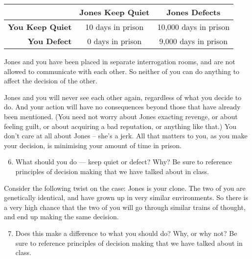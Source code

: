 \documentclass[12pt,a4paper]{article}
\begin{document}
\begin{center}
\begin{tabular}{r ||c| c}
& \textbf{Jones Keep Quiet} & \textbf{Jones Defects}\\ \hline \hline
\textbf{You Keep Quiet} & 10 days in prison & 10,000 days in prison\\ \hline
\textbf{You Defect} & 0 days in prison & 9,000 days in prison\\
\end{tabular}
\end{center}

Jones and you have been placed in separate interrogation rooms, and are not allowed to communicate with each other. So neither of you can do anything to affect the decision of the other. 

Jones and you will never see each other again, regardless of what you decide to do. And your action will have no consequences beyond those that have already been mentioned. (You need not worry about Jones exacting revenge, or about feeling guilt, or about acquiring a bad reputation, or anything like that.) You don't care at all about Jones -- she's a jerk. All that matters to you, as you make your decision, is minimising your amount of time in prison.

\begin{enumerate}
\setcounter{enumi}{5}
\item What should you do --- keep quiet or defect? Why? Be sure to reference principles of decision making that we have talked about in class.
\end{enumerate}

Consider the following twist on the case: Jones is your clone. The two of you are genetically identical, and have grown up in very similar environments. So there is a very high chance that the two of you will go through similar trains of thought, and end up making the same decision.
\begin{enumerate}
\setcounter{enumi}{6}
\item Does this make a difference to what you should do? Why, or why not? Be sure to reference principles of decision making that we have talked about in class.
\end{enumerate}
\end{document}
